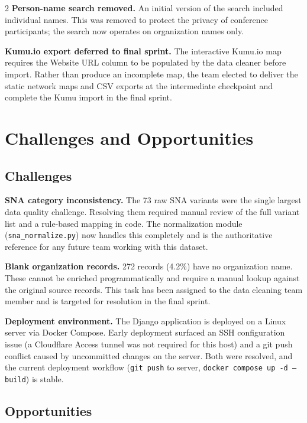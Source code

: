 \documentclass[11pt,letterpaper]{article}
\begin{document}
\begin{multicols}{2}
\textbf{Person-name search removed.} An initial version of the search included
individual names. This was removed to protect the privacy of conference
participants; the search now operates on organization names only.

\textbf{Kumu.io export deferred to final sprint.} The interactive Kumu.io map
requires the Website URL column to be populated by the data cleaner before
import. Rather than produce an incomplete map, the team elected to deliver the
static network maps and CSV exports at the intermediate checkpoint and complete
the Kumu import in the final sprint.

\section{Challenges and Opportunities}

\subsection{Challenges}

\textbf{SNA category inconsistency.} The 73 raw SNA variants were the single
largest data quality challenge. Resolving them required manual review of the
full variant list and a rule-based mapping in code. The normalization module
(\texttt{sna\_normalize.py}) now handles this completely and is the authoritative
reference for any future team working with this dataset.

\textbf{Blank organization records.} 272 records (4.2\%) have no organization
name. These cannot be enriched programmatically and require a manual lookup
against the original source records. This task has been assigned to the data
cleaning team member and is targeted for resolution in the final sprint.

\textbf{Deployment environment.} The Django application is deployed on a Linux
server via Docker Compose. Early deployment surfaced an SSH configuration issue
(a Cloudflare Access tunnel was not required for this host) and a git push
conflict caused by uncommitted changes on the server. Both were resolved, and
the current deployment workflow (\texttt{git push} to server,
\texttt{docker compose up -d --build}) is stable.

\subsection{Opportunities}


\end{multicols}
\end{document}
